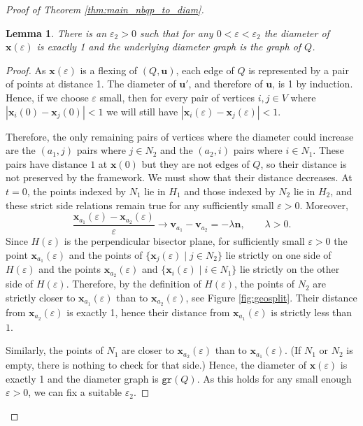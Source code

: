 \documentclass{article}
\newtheorem{lemma}[theorem]{Lemma}
\newcommand{\vu}[0]{\mathbf{u}}
\newcommand{\vv}[0]{\mathbf{v}}
\newcommand{\vn}[0]{\mathbf{n}}
\newcommand{\vx}[0]{\mathbf{x}}
\newcommand{\gr}{\mathtt{gr}}
\begin{document}
\begin{proof}[Proof of Theorem \ref{thm:main_nbqp_to_diam}]
    \begin{lemma}\label{lem:diametergraphcorrect}
        There is an $\varepsilon_2>0$ such that for any $0<\varepsilon<\varepsilon_2$ the diameter of $\vx(\varepsilon)$ is exactly 1 and the underlying diameter graph is the graph of $Q$.
    \end{lemma}
     \begin{proof}
         
      As $\vx(\varepsilon)$ is a flexing of $(Q,\vu)$, each edge of $Q$ is represented by a pair of points at distance 1. The diameter of $\vu'$, and therefore of $\vu$, is 1 by induction. Hence, if we choose $\varepsilon$ small, then for every pair of vertices $i,j\in V$ where $|\vx_i(0)-\vx_j(0)|<1$ we will still have $|\vx_i(\varepsilon)-\vx_j(\varepsilon)|<1$. 
      
     


            

Therefore, the only remaining pairs of vertices where the diameter could increase are the $(a_1,j)$ pairs where $j\in N_2$ and the $(a_2,i)$ pairs where $i\in N_1$. These pairs have distance $1$ at $\vx(0)$ but they are not edges of $Q$, so their distance is not preserved by the framework. We must show that their distance decreases. At $t=0$, the points indexed by $N_1$ lie in $H_1$ and those indexed by $N_2$ lie in $H_2$, and these strict side relations remain true for any sufficiently small $\varepsilon>0$. Moreover,
      \[
          \frac{\vx_{a_1}(\varepsilon)-\vx_{a_2}(\varepsilon)}{\varepsilon}
          \longrightarrow \vv_{a_1}-\vv_{a_2}=-\lambda\vn,
          \qquad \lambda>0.
      \]
      Since $H(\varepsilon)$ is the perpendicular bisector plane, for sufficiently small $\varepsilon>0$ the point $\vx_{a_1}(\varepsilon)$ and the points of $\{\vx_{j}(\varepsilon)\mid j\in N_2\}$ lie strictly on one side of $H(\varepsilon)$ and the points $\vx_{a_2}(\varepsilon)$ and $\{\vx_{i}(\varepsilon)\mid i \in N_1\}$ lie strictly on the other side of $H(\varepsilon)$. Therefore, by the definition of $H(\varepsilon)$, the points of $N_2$ are strictly closer to $\vx_{a_1}(\varepsilon)$ than to $\vx_{a_2}(\varepsilon)$, see Figure \ref{fig:geosplit}. Their distance from $\vx_{a_2}(\varepsilon)$ is exactly 1, hence their distance from $\vx_{a_1}(\varepsilon)$ is strictly less than $1$. 

Similarly, the points of $N_1$ are closer to $\vx_{a_2}(\varepsilon)$ than to $\vx_{a_1}(\varepsilon)$. (If $N_1$ or $N_2$ is empty, there is nothing to check for that side.) Hence, the diameter of $\vx(\varepsilon)$ is exactly 1 and the diameter graph is $\gr (Q)$. As this holds for any small enough $\varepsilon>0$, we can fix a suitable $\varepsilon_2$. 
    \end{proof}


\end{proof}
\end{document}
